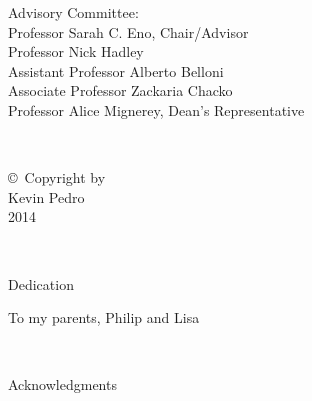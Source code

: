 \documentclass[12pt]{thesis}  %
\renewcommand{\baselinestretch}{2}
\begin{document}
\vspace{7.5em}

\noindent Advisory Committee: \\
Professor Sarah C. Eno, Chair/Advisor \\
Professor Nick Hadley \\
Assistant Professor Alberto Belloni \\
Associate Professor Zackaria Chacko \\
Professor Alice Mignerey, Dean's Representative

\thispagestyle{empty}
\hbox{\ }

\vfill
\renewcommand{\baselinestretch}{1}
\small\normalsize

\vspace{-.65in}

\begin{center}
\large{\copyright \hbox{ }Copyright by\\
Kevin Pedro  %
\\
2014}
\end{center}

\vfill
 
\pagestyle{plain}
\setcounter{page}{2}


\renewcommand{\baselinestretch}{2}
\small\normalsize
\hbox{\ }
 
\vspace{-.65in}

\begin{center}
\large{Dedication}
\end{center} 

\begin{center}
To my parents, Philip and Lisa
\end{center} %

\renewcommand{\baselinestretch}{2}
\small\normalsize
\hbox{\ }
 
\vspace{-.65in}

\begin{center}
\large{Acknowledgments} 
\end{center} 
\end{document}
